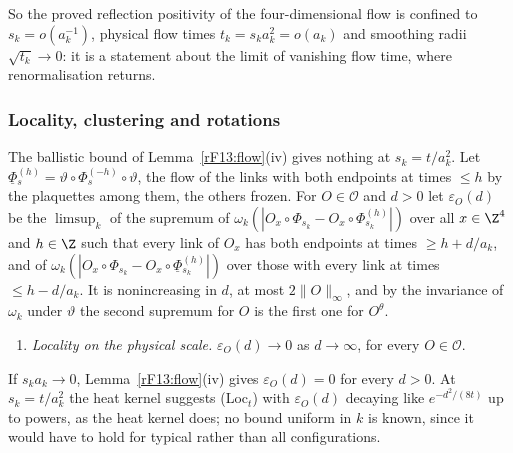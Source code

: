 So the proved reflection positivity of the four-dimensional flow is confined
to $s_k=o(a_k^{-1})$, physical flow times $t_k=s_ka_k^2=o(a_k)$ and smoothing
radii $\sqrt{t_k}\to0$: it is a statement about the limit of vanishing flow
time, where renormalisation returns.
\subsubsection{Locality, clustering and rotations}

The ballistic bound of Lemma~\ref{rF13:flow}(iv) gives nothing at
$s_k=t/a_k^2$. Let $\underline\Phi{}^{(h)}_s=\vartheta\circ\Phi^{(-h)}_s\circ
\vartheta$, the flow of the links with both endpoints at times $\le h$ by the
plaquettes among them, the others frozen. For $O\in\mathcal O$ and $d>0$ let
$\varepsilon_O(d)$ be the $\limsup_k$ of the supremum of
$\omega_k(|O_x\circ\Phi_{s_k}-O_x\circ\Phi^{(h)}_{s_k}|)$ over all $x\in\Z^4$
and $h\in\Z$ such that every link of $O_x$ has both endpoints at times
$\ge h+d/a_k$, and of $\omega_k(|O_x\circ\Phi_{s_k}-O_x\circ
\underline\Phi{}^{(h)}_{s_k}|)$ over those with every link at times $\le
h-d/a_k$. It is nonincreasing in $d$, at most $2\|O\|_\infty$, and by the
invariance of $\omega_k$ under $\vartheta$ the second supremum for $O$ is
the first one for $O^\theta$.
\begin{enumerate}[label=\textup{(Loc$_t$)},leftmargin=*]
\item \emph{Locality on the physical scale.} $\varepsilon_O(d)\to0$ as
$d\to\infty$, for every $O\in\mathcal O$.
\end{enumerate}
If $s_ka_k\to0$, Lemma~\ref{rF13:flow}(iv) gives $\varepsilon_O(d)=0$ for
every $d>0$. At $s_k=t/a_k^2$ the heat kernel suggests (Loc$_t$) with
$\varepsilon_O(d)$ decaying like $e^{-d^2/(8t)}$ up to powers, as the heat
kernel does; no bound uniform in $k$ is known, since it would have to hold
for typical rather than all configurations.

